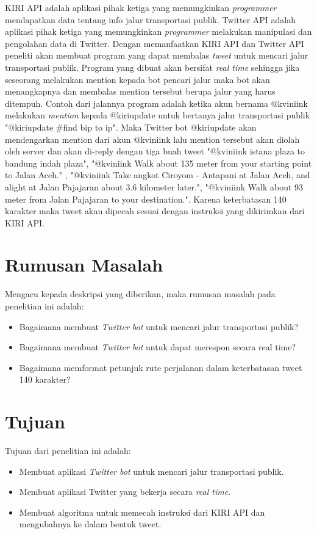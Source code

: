 \documentclass[a4paper,twoside]{article}
\begin{document}
KIRI API adalah aplikasi pihak ketiga yang memungkinkan \textit{programmer} mendapatkan data tentang info jalur transportasi publik. Twitter API adalah aplikasi pihak ketiga yang memungkinkan \textit{programmer} melakukan manipulasi dan pengolahan data di Twitter. Dengan memanfaatkan KIRI API dan Twitter API peneliti akan membuat program yang dapat membalas \textit{tweet} untuk mencari jalur transportasi publik. Program yang dibuat akan bersifat \textit{real time} sehingga jika seseorang melakukan mention kepada bot pencari jalur maka bot akan menangkapnya dan membalas mention tersebut berupa jalur yang harus ditempuh. Contoh dari jalannya program adalah ketika akun bernama @kviniink melakukan \textit{mention} kepada @kiriupdate untuk bertanya jalur transportasi publik "@kiriupdate #find bip to ip". Maka Twitter bot @kiriupdate akan mendengarkan mention dari akun @kviniink lalu mention tersebut akan diolah oleh server dan akan di-reply dengan tiga buah tweet "@kviniink istana plaza to bandung indah plaza", "@kviniink Walk about 135 meter from your starting point to Jalan Aceh." , "@kviniink Take angkot Ciroyom - Antapani at Jalan Aceh, and alight at Jalan Pajajaran about 3.6 kilometer later.", "@kviniink Walk about 93 meter from Jalan Pajajaran to your destination.". Karena keterbatasan 140 karakter maka tweet akan dipecah sesuai dengan instruksi yang dikirimkan dari KIRI API.
\section{Rumusan Masalah}
Mengacu kepada deskripsi yang diberikan, maka rumusan masalah pada penelitian ini adalah:
\begin{itemize}
	\item Bagaimana membuat \textit{Twitter bot} untuk mencari jalur transportasi publik?
	\item Bagaimana membuat \textit{Twitter bot} untuk dapat merespon secara real time?
	\item Bagaimana memformat petunjuk rute perjalanan dalam keterbatasan tweet 140 karakter?
\end{itemize}

\section{Tujuan}
Tujuan dari penelitian ini adalah:
\begin{itemize}
	\item Membuat aplikasi \textit{Twitter bot} untuk mencari jalur transportasi publik.
	\item Membuat aplikasi Twitter yang bekerja secara \textit{real time}.
	\item Membuat algoritma untuk memecah instruksi dari KIRI API dan mengubahnya ke dalam bentuk tweet.
\end{itemize}
\end{document}

